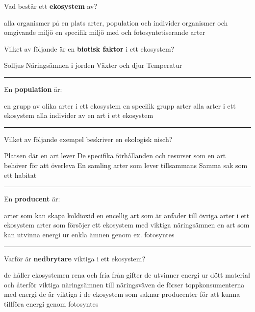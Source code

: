 \documentclass{exam}
\begin{document}
\begin{questions}
\question Vad består ett \textbf{ekosystem} av? 
\begin{checkboxes}
   \choice alla organismer på en plats
   \choice arter, population och individer
   \choice organismer och omgivande miljö
   \choice en specifik miljö med och fotosyntetiserande arter 
\end{checkboxes}

\break
\question Vilket av följande är en \textbf{biotisk faktor} i ett ekosystem?
\begin{checkboxes}
   \choice Solljus
   \choice Näringsämnen i jorden
   \choice Växter och djur
   \choice Temperatur
\end{checkboxes}
\vspace{5mm} 
\hrule 
\vspace{5mm} 
\question En \textbf{population} är:
\begin{checkboxes}
   \choice en grupp av olika arter i ett ekosystem
   \choice en specifik grupp arter
   \choice alla arter i ett ekosystem
   \choice alla individer av en art i ett ekosystem 
\end{checkboxes}

\vspace{5mm} 
\hrule 
\vspace{5mm} 
\question Vilket av följande exempel beskriver en ekologisk nisch?
\begin{checkboxes}
   \choice Platsen där en art lever
   \choice De specifika förhållanden och resurser som en art behöver för att överleva
   \choice En samling arter som lever tillsammans
   \choice Samma sak som ett habitat
\end{checkboxes}

\vspace{5mm} 
\hrule 
\vspace{5mm} 
\question En \textbf{producent} är:
\begin{checkboxes}
   \choice arter som kan skapa koldioxid
   \choice en encellig art som är anfader till övriga arter i ett ekosystem
   \choice arter som försöjer ett ekosystem med viktiga näringsämnen
   \choice en art som kan utvinna energi ur enkla ämnen genom ex. fotosyntes
\end{checkboxes}

\vspace{5mm} 
\hrule 
\vspace{5mm} 
\question Varför är \textbf{nedbrytare} viktiga i ett ekosystem?
\begin{checkboxes}
   \choice de håller ekosystemen rena och fria från gifter
   \choice de utvinner energi ur dött material och återför viktiga näringsämnen till näringsväven
   \choice de förser toppkonsumenterna med energi
   \choice de är viktiga i de ekosystem som saknar producenter för att kunna tillföra energi genom fotosyntes
\end{checkboxes}
\break


\end{questions}
\end{document}
